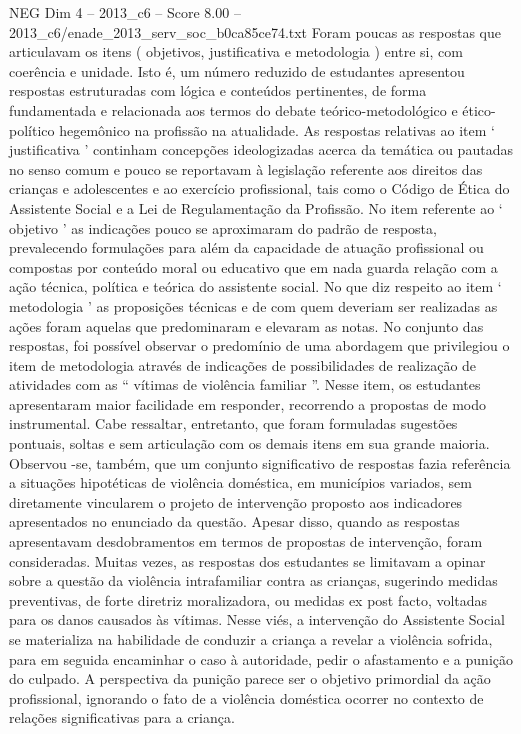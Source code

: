 \begin{textsample}{NEG Dim 4 – 2013\_c6 – Score 8.00 – 2013\_c6/enade\_2013\_serv\_soc\_b0ca85ce74.txt}
Foram poucas as respostas que articulavam os itens ( objetivos, justificativa e metodologia ) entre si, com coerência e unidade.
Isto é, um número reduzido de estudantes apresentou respostas estruturadas com lógica e conteúdos pertinentes, de forma fundamentada e relacionada aos termos do debate teórico-metodológico e ético-político hegemônico na profissão na atualidade.
As respostas relativas ao item ‘ justificativa ’ continham concepções ideologizadas acerca da temática ou pautadas no senso comum e pouco se reportavam à legislação referente aos direitos das crianças e adolescentes e ao exercício profissional, tais como o Código de Ética do Assistente Social e a Lei de Regulamentação da Profissão.
No item referente ao ‘ objetivo ’ as indicações pouco se aproximaram do padrão de resposta, prevalecendo formulações para além da capacidade de atuação profissional ou compostas por conteúdo moral ou educativo que em nada guarda relação com a ação técnica, política e teórica do assistente social.
No que diz respeito ao item ‘ metodologia ’ as proposições técnicas e de com quem deveriam ser realizadas as ações foram aquelas que predominaram e elevaram as notas.
No conjunto das respostas, foi possível observar o predomínio de uma abordagem que privilegiou o item de metodologia através de indicações de possibilidades de realização de atividades com as “ vítimas de violência familiar ”.
Nesse item, os estudantes apresentaram maior facilidade em responder, recorrendo a propostas de modo instrumental.
Cabe ressaltar, entretanto, que foram formuladas sugestões pontuais, soltas e sem articulação com os demais itens em sua grande maioria.
Observou -se, também, que um conjunto significativo de respostas fazia referência a situações hipotéticas de violência doméstica, em municípios variados, sem diretamente vincularem o projeto de intervenção proposto aos indicadores apresentados no enunciado da questão.
Apesar disso, quando as respostas apresentavam desdobramentos em termos de propostas de intervenção, foram consideradas.
Muitas vezes, as respostas dos estudantes se limitavam a opinar sobre a questão da violência intrafamiliar contra as crianças, sugerindo medidas preventivas, de forte diretriz moralizadora, ou medidas ex post facto, voltadas para os danos causados às vítimas.
Nesse viés, a intervenção do Assistente Social se materializa na habilidade de conduzir a criança a revelar a violência sofrida, para em seguida encaminhar o caso à autoridade, pedir o afastamento e a punição do culpado.
A perspectiva da punição parece ser o objetivo primordial da ação profissional, ignorando o fato de a violência doméstica ocorrer no contexto de relações significativas para a criança.

\end{textsample}
